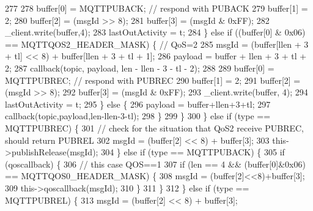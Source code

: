 \begin{DoxyCode}
277 
278                             buffer[0] = MQTTPUBACK; \textcolor{comment}{// respond with PUBACK}
279                             buffer[1] = 2;
280                             buffer[2] = (msgId >> 8);
281                             buffer[3] = (msgId & 0xFF);
282                             _client.write(buffer,4);
283                             lastOutActivity = t;
284                                     \} \textcolor{keywordflow}{else} \textcolor{keywordflow}{if} ((buffer[0] & 0x06) == 
      MQTTQOS2_HEADER_MASK) \{ \textcolor{comment}{// QoS=2}
285                                           msgId = (buffer[llen + 3 + tl] << 8) + 
      buffer[llen + 3 + tl + 1];
286                                           payload = buffer + llen + 3 + tl + 2;
287                                           callback(topic, payload, len - llen - 3 - tl - 2);
288 
289                                         buffer[0] = MQTTPUBREC; \textcolor{comment}{// respond with PUBREC}
290                                         buffer[1] = 2;
291                                         buffer[2] = (msgId >> 8);
292                                         buffer[3] = (msgId & 0xFF);
293                                         _client.write(buffer, 4);
294                                         lastOutActivity = t;
295                                     \} \textcolor{keywordflow}{else} \{
296                             payload = buffer+llen+3+tl;
297                             callback(topic,payload,len-llen-3-tl);
298                         \}
299                     \}
300                 \} \textcolor{keywordflow}{else} \textcolor{keywordflow}{if} (type == MQTTPUBREC) \{
301                     \textcolor{comment}{// check for the situation that QoS2 receive PUBREC, should return PUBREL}
302                     msgId = (buffer[2] << 8) + buffer[3];
303                     this->publishRelease(msgId);
304                 \} \textcolor{keywordflow}{else} \textcolor{keywordflow}{if} (type == MQTTPUBACK) \{
305                     \textcolor{keywordflow}{if} (qoscallback) \{
306                         \textcolor{comment}{// this case QOS==1}
307                         \textcolor{keywordflow}{if} (len == 4 && (buffer[0]&0x06) == MQTTQOS0_HEADER_MASK) \{
308                             msgId = (buffer[2]<<8)+buffer[3];
309                             this->qoscallback(msgId);
310                         \}
311                     \}
312                 \} \textcolor{keywordflow}{else} \textcolor{keywordflow}{if} (type == MQTTPUBREL) \{
313                   msgId = (buffer[2] << 8) + buffer[3];

\end{DoxyCode}

